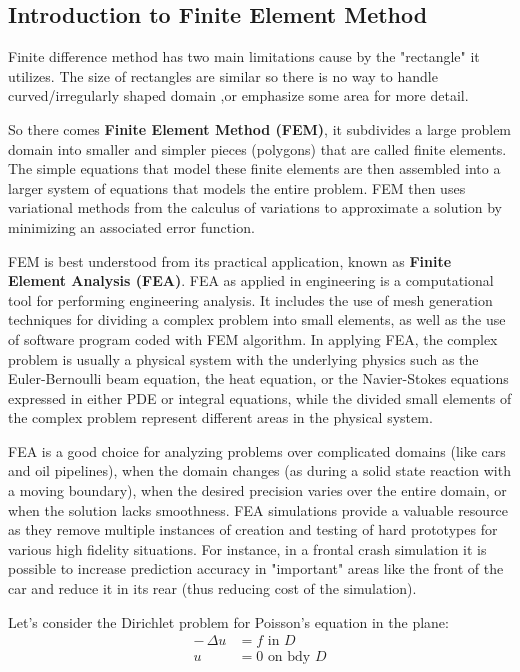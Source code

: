 \documentclass[../main.tex]{subfiles}
\begin{document}
\subsection{Introduction to Finite Element Method}

Finite difference method has two main limitations cause by the "rectangle" it utilizes. The size of rectangles are similar so there is no way to handle curved/irregularly shaped domain ,or emphasize some area for more detail.

So there comes \textbf{Finite Element Method (FEM)}, it subdivides a large problem domain into smaller and simpler pieces (polygons) that are called finite elements. The simple equations that model these finite elements are then assembled into a larger system of equations that models the entire problem. FEM then uses variational methods from the calculus of variations to approximate a solution by minimizing an associated error function.

FEM is best understood from its practical application, known as \textbf{Finite Element Analysis (FEA)}. FEA as applied in engineering is a computational tool for performing engineering analysis. It includes the use of mesh generation techniques for dividing a complex problem into small elements, as well as the use of software program coded with FEM algorithm. In applying FEA, the complex problem is usually a physical system with the underlying physics such as the Euler-Bernoulli beam equation, the heat equation, or the Navier-Stokes equations expressed in either PDE or integral equations, while the divided small elements of the complex problem represent different areas in the physical system.

FEA is a good choice for analyzing problems over complicated domains (like cars and oil pipelines), when the domain changes (as during a solid state reaction with a moving boundary), when the desired precision varies over the entire domain, or when the solution lacks smoothness. FEA simulations provide a valuable resource as they remove multiple instances of creation and testing of hard prototypes for various high fidelity situations. For instance, in a frontal crash simulation it is possible to increase prediction accuracy in "important" areas like the front of the car and reduce it in its rear (thus reducing cost of the simulation).

Let's consider the Dirichlet problem for Poisson's equation in the plane:
\begin{equation} \label{eq:FEM1}
    \begin{split}
     - \, \Delta u & = f \text{ in } D \\
    u & = 0 \text{ on bdy } D
    \end{split}
\end{equation}
\end{document}
